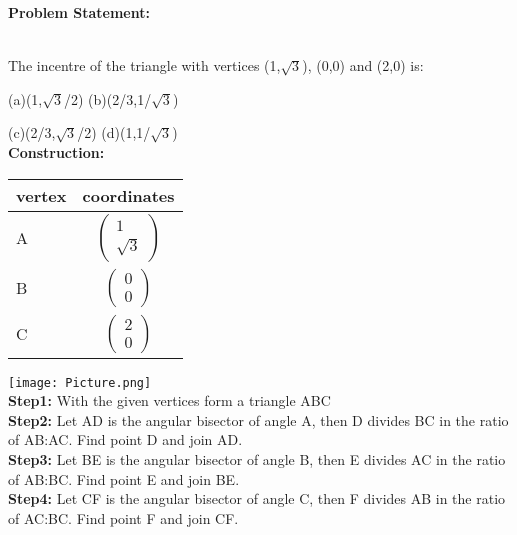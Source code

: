 \documentclass[10pt,a4paper]{report}
\begin{document}
\begin{multicols}{2}
\raggedright \textbf{Problem Statement:}\vspace{2mm}
\raggedright \\The incentre of the triangle with vertices (1,$\sqrt{3}$), (0,0) and (2,0) is:

(a)(1,$\sqrt{3}$/2) \hspace{2cm} (b)(2/3,1/$\sqrt{3}$) 

(c)(2/3,$\sqrt{3}$/2) \hspace{2cm}  (d)(1,1/$\sqrt{3}$)\\
\vspace{5mm}
 \vspace{2mm} 
 \textbf{Construction:}
\begin{center}
\setlength{\arrayrulewidth}{0.5mm}
\setlength{\tabcolsep}{6pt}
\renewcommand{\arraystretch}{1.5}
    \begin{tabular}{|l|c|} \hline
    \textbf{vertex} & \textbf{coordinates} \\ \hline
   A & $ \begin{pmatrix} 
1 \\
\sqrt{3}
\end{pmatrix} $ \\ \hline
   B & $ \begin{pmatrix} 
0 \\
0
\end{pmatrix} $ \\ \hline  
   C & $ \begin{pmatrix} 
2 \\
0
\end{pmatrix} $ \\ \hline
      \end{tabular}
  \end{center}
\texttt{[image: Picture.png]}
\\
\textbf{Step1:} With the given vertices form a triangle ABC
\newline
\\
\textbf{Step2:} Let AD is the angular bisector of angle A, then D divides BC in the ratio of AB:AC. Find point D and join AD.
\newline
\\
\textbf{Step3:} Let BE is the angular bisector of angle B, then E divides AC in the ratio of AB:BC. Find point E and join BE.
\newline
\\
\textbf{Step4:} Let CF is the angular bisector of angle C, then F divides AB in the ratio of AC:BC. Find point F and join CF.

\end{multicols}
\end{document}
